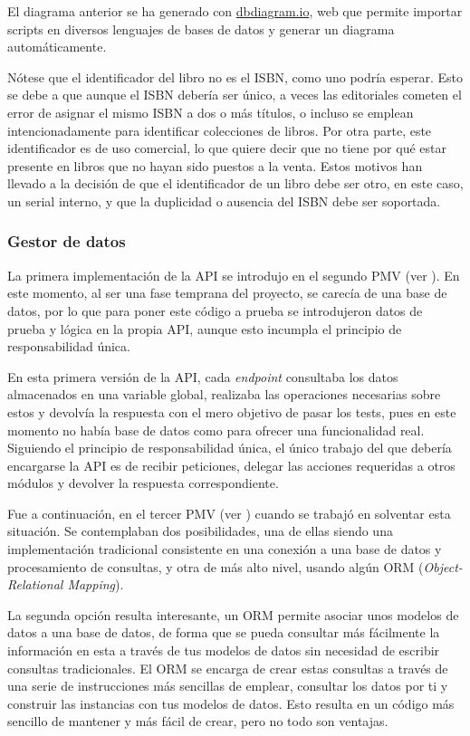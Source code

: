 El diagrama anterior se ha generado con \href{https://dbdiagram.io/}{dbdiagram.io}, web que permite importar scripts en diversos lenguajes de bases de datos y generar un diagrama automáticamente.

Nótese que el identificador del libro no es el ISBN, como uno podría esperar. Esto se debe a que aunque el ISBN debería ser único, a veces las editoriales cometen el error de asignar el mismo ISBN a dos o más títulos, o incluso se emplean intencionadamente para identificar colecciones de libros. Por otra parte, este identificador es de uso comercial, lo que quiere decir que no tiene por qué estar presente en libros que no hayan sido puestos a la venta. Estos motivos han llevado a la decisión de que el identificador de un libro debe ser otro, en este caso, un serial interno, y que la duplicidad o ausencia del ISBN debe ser soportada.

\subsubsection{Gestor de datos}

La primera implementación de la API se introdujo en el segundo PMV (ver \underline{}). En este momento, al ser una fase temprana del proyecto, se carecía de una base de datos, por lo que para poner este código a prueba se introdujeron datos de prueba y lógica en la propia API, aunque esto incumpla el principio de responsabilidad única.

En esta primera versión de la API, cada \textit{endpoint} consultaba los datos almacenados en una variable global, realizaba las operaciones necesarias sobre estos y devolvía la respuesta con el mero objetivo de pasar los tests, pues en este momento no había base de datos como para ofrecer una funcionalidad real. Siguiendo el principio de responsabilidad única, el único trabajo del que debería encargarse la API es de recibir peticiones, delegar las acciones requeridas a otros módulos y devolver la respuesta correspondiente.

Fue a continuación, en el tercer PMV (ver \underline{}) cuando se trabajó en solventar esta situación. Se contemplaban dos posibilidades, una de ellas siendo una implementación tradicional consistente en una conexión a una base de datos y procesamiento de consultas, y otra de más alto nivel, usando algún ORM (\textit{Object-Relational Mapping}).

La segunda opción resulta interesante, un ORM permite asociar unos modelos de datos a una base de datos, de forma que se pueda consultar más fácilmente la información en esta a través de tus modelos de datos sin necesidad de escribir consultas tradicionales. El ORM se encarga de crear estas consultas a través de una serie de instrucciones más sencillas de emplear, consultar los datos por ti y construir las instancias con tus modelos de datos. Esto resulta en un código más sencillo de mantener y más fácil de crear, pero no todo son ventajas.

